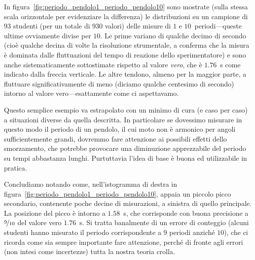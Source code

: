 
In figura~\ref{fig:periodo_pendolo1_periodo_pendolo10} sono mostrate (sulla
stessa scala orizzontale per evidenziare la differenza) le distribuzioni
su un campione di $93$ studenti (per un totale di $930$ valori) delle misure
di $1$ e $10$~periodi---queste ultime ovviamente divise per $10$. Le prime
variano di qualche decimo di secondo (cioè qualche decina di volte la
risoluzione strumentale, a conferma che la misura è dominata dalle
fluttuazioni del tempo di reazione dello sperimentatore) e sono anche
sistematicamente sottostimate rispetto al valore \emph{vero}, che è
$1.76$~s come indicato dalla freccia verticale.
Le altre tendono, almeno per la maggior parte, a fluttuare significativamente
di meno (diciamo qualche centesimo di secondo) intorno al valore
vero---esattamente come ci aspettavamo.

Questo semplice esempio va estrapolato con un minimo di cura (e caso per caso)
a situazioni diverse da quella descritta. In particolare se dovessimo misurare
in questo modo il periodo di un pendolo, il cui moto non è armonico per
angoli sufficientemente grandi, dovremmo fare attenzione ai possibili
effetti dello smorzamento, che potrebbe provocare una diminuzione apprezzabile
del periodo su tempi abbastanza lunghi. Purtuttavia l'idea di base è buona
ed utilizzabile in pratica.

Concludiamo notando come, nell'istogramma di destra in
figura~\ref{fig:periodo_pendolo1_periodo_pendolo10}, appaia un piccolo picco
secondario, contenente poche decine di misurazioni, a sinistra di quello
principale. La posizione del picco è intorno a $1.58$~s, che corrisponde
con buona precisione a $\nicefrac{9}{10}$ del valore vero $1.76$~s.
Si tratta banalmente di un errore di conteggio (alcuni studenti hanno misurato
il periodo corrispondente a $9$ periodi anziché $10$), che ci ricorda come
sia sempre importante fare attenzione, perché di fronte agli errori
(non intesi come incertezze) tutta la nostra teoria crolla.


